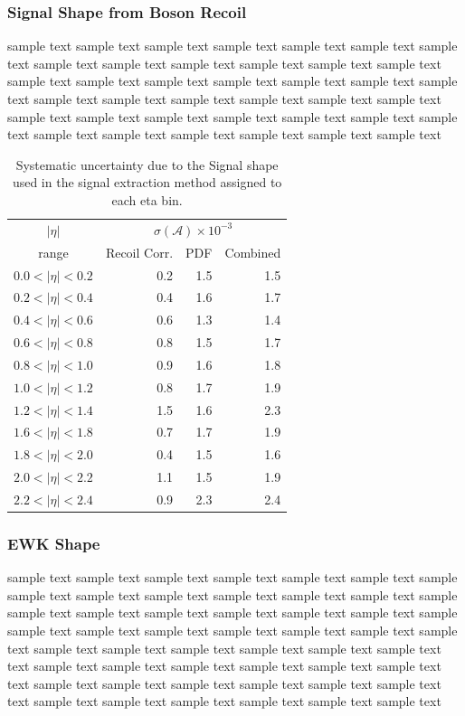 \subsubsection{Signal \ETm Shape from Boson Recoil}
sample text sample text sample text sample text sample text sample text sample
text sample text sample text sample text sample text sample text sample text
sample text sample text sample text sample text sample text sample text sample
text sample text sample text sample text sample text sample text sample text
sample text sample text sample text sample text sample text sample text sample
text sample text sample text sample text sample text sample text sample text

\begin{table}[htb]
\begin{center}
\begin{tabular}{crrr}
$|\eta|$  & \multicolumn{3}{c}{$\sigma(\mathcal{A}) \times 10^{-3}$}\\
range     & Recoil Corr.& PDF & Combined \\
\hline
$0.0<|\eta|<0.2$ &  0.2 &  1.5  & 1.5 \\
$0.2<|\eta|<0.4$ &  0.4 &  1.6  & 1.7 \\
$0.4<|\eta|<0.6$ &  0.6 &  1.3  & 1.4 \\
$0.6<|\eta|<0.8$ &  0.8 &  1.5  & 1.7 \\
$0.8<|\eta|<1.0$ &  0.9 &  1.6  & 1.8 \\
$1.0<|\eta|<1.2$ &  0.8 &  1.7  & 1.9 \\
$1.2<|\eta|<1.4$ &  1.5 &  1.6  & 2.3 \\
$1.6<|\eta|<1.8$ &  0.7 &  1.7  & 1.9 \\
$1.8<|\eta|<2.0$ &  0.4 &  1.5  & 1.6 \\
$2.0<|\eta|<2.2$ &  1.1 &  1.5  & 1.9 \\
$2.2<|\eta|<2.4$ &  0.9 &  2.3  & 2.4 \\
\end{tabular}
\caption{\label{tab:systSIG}Systematic uncertainty due to the Signal \MET shape
used in the signal extraction method assigned to each eta bin.}
\end{center}
\end{table}

\subsubsection{EWK \ETm Shape}
sample text sample text sample text sample text sample text sample text sample
sample text sample text sample text sample text sample text sample text sample
sample text sample text sample text sample text sample text sample text sample
sample text sample text sample text sample text sample text sample text sample
text sample text sample text sample text sample text sample text sample text
text sample text sample text sample text sample text sample text sample text
text sample text sample text sample text sample text sample text sample text
text sample text sample text sample text sample text sample text sample text


